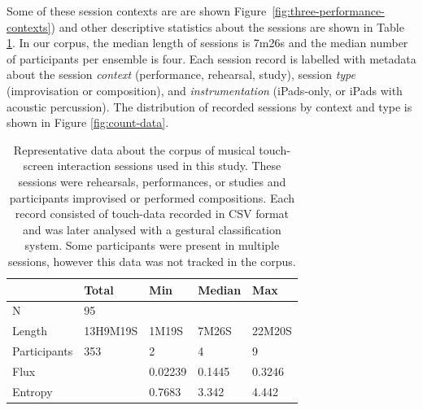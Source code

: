 \documentclass{sigchi}
\begin{document}
Some of these session contexts are are shown
Figure~\ref{fig:three-performance-contexts}) and other descriptive
statistics about the sessions are shown in Table \ref{corpus-table}.
In our corpus, the median length of sessions is 7m26s and the median
number of participants per ensemble is four. Each session record is
labelled with metadata about the session \emph{context} (performance,
rehearsal, study), session \emph{type} (improvisation or composition),
and \emph{instrumentation} (iPads-only, or iPads with acoustic
percussion). The distribution of recorded sessions by context and type
is shown in Figure \ref{fig:count-data}.


\begin{table}
\centering
\begin{tabular}{l|llll}
\hline
            & Total & Min  & Median   & Max     \\ 
\hline
N           & 95    &      &          &         \\
Length & 13H9M19S & 1M19S & 7M26S & 22M20S \\
Participants& 353   & 2    & 4        & 9        \\
Flux &   & 0.02239 & 0.1445 & 0.3246\\
Entropy &   & 0.7683 & 3.342 & 4.442\\          
\hline
\end{tabular}
\caption{
  Representative data about the corpus of musical touch-screen
  interaction sessions used in this study. These sessions were
  rehearsals, performances, or studies and
  participants improvised or performed compositions. Each record
  consisted of touch-data recorded in CSV format and was later analysed
  with a gestural classification system. Some participants were
  present in multiple sessions, however this data was not tracked in
  the corpus.\label{corpus-table}}
\end{table}
\end{document}
